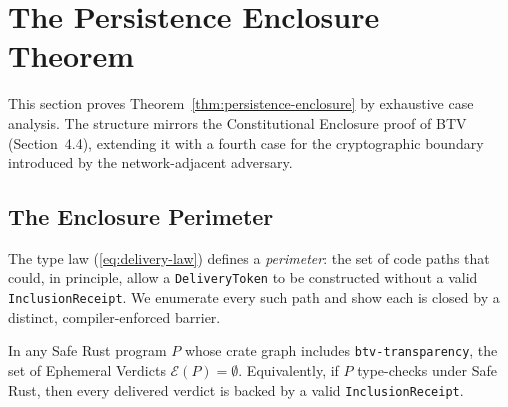 \section{The Persistence Enclosure Theorem}
\label{sec:theorem}

This section proves Theorem~\ref{thm:persistence-enclosure} by exhaustive
case analysis. The structure mirrors the Constitutional Enclosure proof
of BTV~\cite{btv2026} (Section~4.4), extending it with a fourth case
for the cryptographic boundary introduced by the network-adjacent adversary.

\subsection{The Enclosure Perimeter}

The type law (\ref{eq:delivery-law}) defines a \emph{perimeter}:
the set of code paths that could, in principle, allow a
\texttt{DeliveryToken} to be constructed without a valid
\texttt{InclusionReceipt}. We enumerate every such path and show
each is closed by a distinct, compiler-enforced barrier.

\begin{theorem}
\label{thm:pe-full}
In any Safe Rust program $P$ whose crate graph includes
\texttt{btv-transparency}, the set of Ephemeral Verdicts
$\mathcal{E}(P) = \emptyset$.
Equivalently, if $P$ type-checks under Safe Rust, then every
delivered verdict is backed by a valid \texttt{InclusionReceipt}.
\end{theorem}

